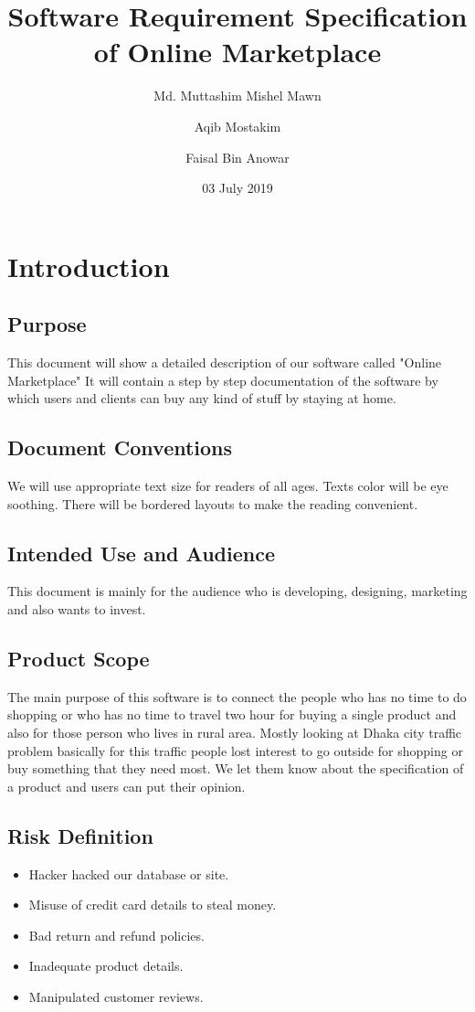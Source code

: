\documentclass{article}
\title{Software Requirement Specification of Online Marketplace}
\author{Md. Muttashim Mishel Mawn \and Aqib Mostakim \and Faisal Bin Anowar}
\date{03 July 2019}
\begin{document}
\tableofcontents
\clearpage
\maketitle


\section{Introduction}
\subsection{Purpose}
This document will show a detailed description of our software called "Online Marketplace" It will contain a step by step documentation of the software by which users and clients can buy any kind of stuff by staying at home.
\subsection{Document Conventions}
We will use appropriate text size for readers of all ages. Texts color will be eye soothing. There will be bordered layouts to make the reading convenient.
\subsection{Intended Use and Audience}
This document is mainly for the audience who is developing, designing, marketing and also wants to invest.
\subsection{Product Scope}
The main purpose of this software is to connect the people who has no time to do shopping or who has no time to travel two hour for buying a single product and also for those person who lives in rural area. Mostly looking at Dhaka city traffic problem basically for this traffic people lost interest to go outside for shopping or buy something that they need most. We let them know about the specification of a product and users can put their opinion.
\subsection{Risk Definition}
\begin{itemize}
\item Hacker hacked our database or site.
\item Misuse of credit card details to steal money.
\item Bad return and refund policies. 
\item Inadequate product details.
\item Manipulated customer reviews.
\end{itemize}
\end{document}
